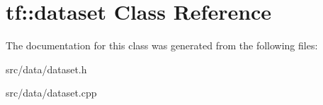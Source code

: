 \hypertarget{classtf_1_1dataset}{}\section{tf\+:\+:dataset Class Reference}
\label{classtf_1_1dataset}


The documentation for this class was generated from the following files\+:\begin{DoxyCompactItemize}
\item 
src/data/dataset.\+h\item 
src/data/dataset.\+cpp\end{DoxyCompactItemize}
